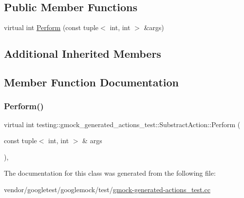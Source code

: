\subsection*{Public Member Functions}
\begin{DoxyCompactItemize}
\item 
virtual int \hyperlink{classtesting_1_1gmock__generated__actions__test_1_1_substract_action_ac049ec6196668e17ef7384e08914f2c3}{Perform} (const tuple$<$ int, int $>$ \&args)
\end{DoxyCompactItemize}
\subsection*{Additional Inherited Members}


\subsection{Member Function Documentation}
\mbox{\label{classtesting_1_1gmock__generated__actions__test_1_1_substract_action_ac049ec6196668e17ef7384e08914f2c3}} 
\subsubsection{\texorpdfstring{Perform()}{Perform()}}
{\footnotesize\ttfamily virtual int testing\+::gmock\+\_\+generated\+\_\+actions\+\_\+test\+::\+Substract\+Action\+::\+Perform (\begin{DoxyParamCaption}\item[{const tuple$<$ int, int $>$ \&}]{args }\end{DoxyParamCaption})\hspace{0.3cm}{\ttfamily [inline]}, {\ttfamily [virtual]}}



The documentation for this class was generated from the following file\+:\begin{DoxyCompactItemize}
\item 
vendor/googletest/googlemock/test/\hyperlink{gmock-generated-actions__test_8cc}{gmock-\/generated-\/actions\+\_\+test.\+cc}\end{DoxyCompactItemize}
